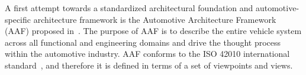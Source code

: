 A first attempt towards a standardized architectural foundation and automotive-specific
architecture framework is the Automotive
Architecture Framework (AAF) proposed in~\cite{Broy}. 
The purpose of AAF is to describe the entire vehicle system
across all functional and engineering domains and drive the thought process within the
automotive industry.
 AAF conforms to the ISO 42010 international standard~\cite{42010}, and therefore it is defined in terms of a set of viewpoints and views. 
%
%
%
%
%

